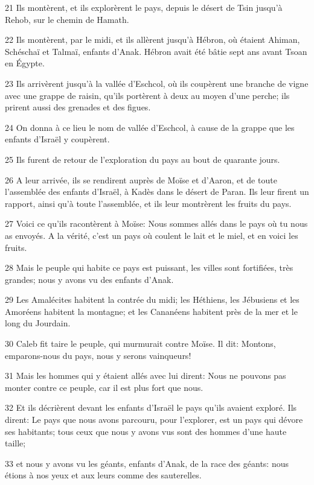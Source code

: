 \par 21 Ils montèrent, et ils explorèrent le pays, depuis le désert de Tsin jusqu'à Rehob, sur le chemin de Hamath.
\par 22 Ils montèrent, par le midi, et ils allèrent jusqu'à Hébron, où étaient Ahiman, Schéschaï et Talmaï, enfants d'Anak. Hébron avait été bâtie sept ans avant Tsoan en Égypte.
\par 23 Ils arrivèrent jusqu'à la vallée d'Eschcol, où ils coupèrent une branche de vigne avec une grappe de raisin, qu'ils portèrent à deux au moyen d'une perche; ils prirent aussi des grenades et des figues.
\par 24 On donna à ce lieu le nom de vallée d'Eschcol, à cause de la grappe que les enfants d'Israël y coupèrent.
\par 25 Ils furent de retour de l'exploration du pays au bout de quarante jours.
\par 26 A leur arrivée, ils se rendirent auprès de Moïse et d'Aaron, et de toute l'assemblée des enfants d'Israël, à Kadès dans le désert de Paran. Ils leur firent un rapport, ainsi qu'à toute l'assemblée, et ils leur montrèrent les fruits du pays.
\par 27 Voici ce qu'ils racontèrent à Moïse: Nous sommes allés dans le pays où tu nous as envoyés. A la vérité, c'est un pays où coulent le lait et le miel, et en voici les fruits.
\par 28 Mais le peuple qui habite ce pays est puissant, les villes sont fortifiées, très grandes; nous y avons vu des enfants d'Anak.
\par 29 Les Amalécites habitent la contrée du midi; les Héthiens, les Jébusiens et les Amoréens habitent la montagne; et les Cananéens habitent près de la mer et le long du Jourdain.
\par 30 Caleb fit taire le peuple, qui murmurait contre Moïse. Il dit: Montons, emparons-nous du pays, nous y serons vainqueurs!
\par 31 Mais les hommes qui y étaient allés avec lui dirent: Nous ne pouvons pas monter contre ce peuple, car il est plus fort que nous.
\par 32 Et ils décrièrent devant les enfants d'Israël le pays qu'ils avaient exploré. Ils dirent: Le pays que nous avons parcouru, pour l'explorer, est un pays qui dévore ses habitants; tous ceux que nous y avons vus sont des hommes d'une haute taille;
\par 33 et nous y avons vu les géants, enfants d'Anak, de la race des géants: nous étions à nos yeux et aux leurs comme des sauterelles.

